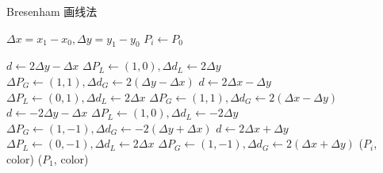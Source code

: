 \documentclass{article}
\begin{document}
\begin{algorithm}
    \caption{Bresenham 画线法}

    \BlankLine

    $\Delta x = x_1-x_0, \Delta y = y_1-y_0$\;
    $P_i\leftarrow P_0$\;

    {
        $d\leftarrow 2\Delta y-\Delta x$\;
        $\Delta P_L \leftarrow (1,0), \Delta d_L \leftarrow 2\Delta y$\;
        $\Delta P_G \leftarrow (1,1), \Delta d_G \leftarrow 2(\Delta y - \Delta x)$\;
    }
    {
        $d\leftarrow 2\Delta x-\Delta y$\;
        $\Delta P_L \leftarrow (0,1), \Delta d_L \leftarrow 2\Delta x$\;
        $\Delta P_G \leftarrow (1,1), \Delta d_G \leftarrow 2(\Delta x - \Delta y)$\;
    }
    \uElseIf{$k\in[-1,0)$}
    {
        $d\leftarrow -2\Delta y-\Delta x$\;
        $\Delta P_L \leftarrow (1,0), \Delta d_L \leftarrow -2\Delta y$\;
        $\Delta P_G \leftarrow (1,-1), \Delta d_G \leftarrow -2(\Delta y + \Delta x)$\;
    }
    \Else 
    {
        $d\leftarrow 2\Delta x+\Delta y$\;
        $\Delta P_L \leftarrow (0,-1), \Delta d_L \leftarrow 2\Delta x$\;
        $\Delta P_G \leftarrow (1,-1), \Delta d_G \leftarrow 2(\Delta x + \Delta y)$\;
    }
    {
        \putpixel($P_i$, color)\;
    }
    \putpixel($P_1$, color)\;
\end{algorithm}
\end{document}
